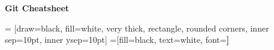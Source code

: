 \documentclass[a4paper]{article}
\begin{document}
\begin{center}
	\textcolor{lightpurple}{
		\textbf{{Git Cheatsheet}}\\
	}
	\vspace{-3mm}
\end{center}



\footnotesize
\begin{multicols*}{3}

 = [draw=black, fill=white, very thick,
    rectangle, rounded corners, inner sep=10pt, inner ysep=10pt]
 =[fill=black, text=white, font=\bfseries]


\vspace{-2mm}

\vspace{-2mm}

\vspace{-3mm}

\vspace{-1mm}

\vspace{-2mm}

\vspace{-2mm}

\vspace{-2mm}


\end{multicols*}
\end{document}
